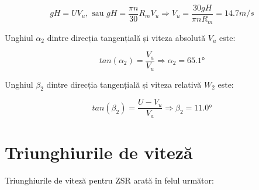\begin{equation}
gH=UV_{u}, \text{ sau } gH=\frac{\pi n}{30} R_m V_{u} \Rightarrow V_{u} = \frac{30gH}{\pi n R_m} = 14.7\si{m/s}
\end{equation}


Unghiul $\alpha_2$ dintre direcția tangențială și viteza absolută $V_u$ este:

\begin{equation}
tan(\alpha_{2 })=\frac{V_{a}}{V_{u}} \Rightarrow \alpha_{2}=65.1\si{\degree}
\end{equation}



Unghiul $\beta_2$ dintre direcția tangențială și viteza relativă $W_2$ este:

\begin{equation}
tan(\beta_{2})=\frac{U - V_u}{V_a} \Rightarrow \beta_{2} =11.0\si{\degree}
\end{equation}


\section{Triunghiurile de viteză}

Triunghiurile de viteză pentru ZSR arată în felul următor:

